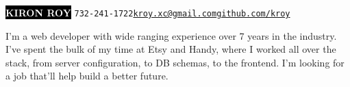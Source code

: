 \documentclass[9pt]{developercv} %
\begin{document}

\begin{minipage}[t]{1\textwidth} %
    \vspace{-\baselineskip} %
    
    \colorbox{black}{{\HUGE\textcolor{white}{\textbf{\MakeUppercase{Kiron Roy}}}}} \hspace{.3 cm} \large\texttt{732-241-1722\slashsep\href{mailto:kroy.xc@gmail.com}{kroy.xc@gmail.com}\slashsep\href{https://github.com/kroy}{github.com/kroy}}
    
    \vspace{6pt}
    
\end{minipage}

\vspace{0.5cm}



\begin{minipage}[t]{0.4\textwidth} %
    \vspace{-\baselineskip} %
    
    I'm a web developer with wide ranging experience over 7 years in the industry. I've spent the bulk of my time at Etsy and Handy, where I worked all over the stack, from server configuration, to DB schemas, to the frontend. I'm looking for a job that'll help build a better future.
\end{minipage}
\hfill %
\begin{minipage}[t]{0.5\textwidth} %
    \vspace{-\baselineskip} %
    \\
    \\
    \\
\end{minipage}
\end{document}
